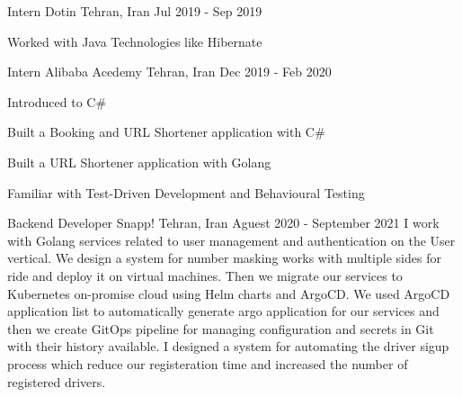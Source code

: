 
\begin{cventries}

  \cventry
    {Intern} %
    {Dotin} %
    {Tehran, Iran} %
    {Jul 2019 - Sep 2019} %
    {
      \begin{cvitems} %
        \item {Worked with Java Technologies like Hibernate}
      \end{cvitems}
    }

  \cventry
    {Intern} %
    {Alibaba Acedemy} %
    {Tehran, Iran} %
    {Dec 2019 - Feb 2020} %
    {
      \begin{cvitems} %
        \item {Introduced to C\#}
        \item {Built a Booking and URL Shortener application with C\#}
        \item {Built a URL Shortener application with Golang}
        \item {Familiar with Test-Driven Development and Behavioural Testing}
      \end{cvitems}
    }

  \cventry
    {Backend Developer} %
    {Snapp!} %
    {Tehran, Iran} %
    {Aguest 2020 - September 2021} %
    {
      I work with Golang services related to user management and authentication on the User vertical.
      We design a system for number masking works with multiple sides for ride and deploy it on virtual machines.
      Then we migrate our services to Kubernetes on-promise cloud using Helm charts and ArgoCD.
      We used ArgoCD application list to automatically generate argo application for our services and then
      we create GitOps pipeline for managing configuration and secrets in Git with their history available.
      I designed a system for automating the driver sigup process which reduce our registeration time and increased
      the number of registered drivers.
    }


\end{cventries}
